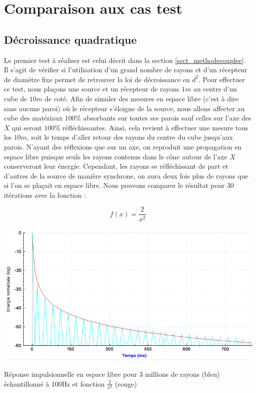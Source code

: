 \section{Comparaison aux cas test}
		\subsection{Décroissance quadratique}
Le premier test à réaliser est celui décrit dans la section \ref{sect_methodecouplee}. Il s'agit de vérifier si l'utilisation d'un grand nombre de rayons et d'un récepteur de diamètre fixe permet de retrouver la loi de décroissance en $d^2$. Pour effectuer ce test, nous plaçons une source et un récepteur de rayons $1m$ au centre d'un cube de $10m$ de coté. Afin de simuler des mesures en espace libre (c'est à dire sans aucune paroi) où le récepteur s'éloigne de la source, nous allons affecter au cube des matériaux $100\%$ absorbants sur toutes ses parois sauf celles sur l'axe des $X$ qui seront $100\%$ réfléchissantes. Ainsi, cela revient à effectuer une mesure tous les $10m$, soit le temps d'aller retour des rayons du centre du cube jusqu'aux parois. N'ayant des réflexions que sur un axe, on reproduit une propagation en espace libre puisque seuls les rayons contenus dans le cône autour de l'axe $X$ conserveront leur énergie. Cependant, les rayons se réfléchissant de part et d'autres de la source de manière synchrone, on aura deux fois plus de rayons que si l'on se plaçait en espace libre. Nous pouvons comparer le résultat pour 30 itérations avec la fonction :

\begin{equation*}
f(x) = \frac{2}{x^2}
\end{equation*}

\begin{figureth}
	\includegraphics[width=0.8\linewidth]{images/test1}
	\caption{Réponse impulsionnelle en espace libre pour 3 millions de rayons (bleu) échantillonné à 100Hz et fonction $\frac{2}{x^2}$ (rouge)}
	\label{test1}
\end{figureth}

